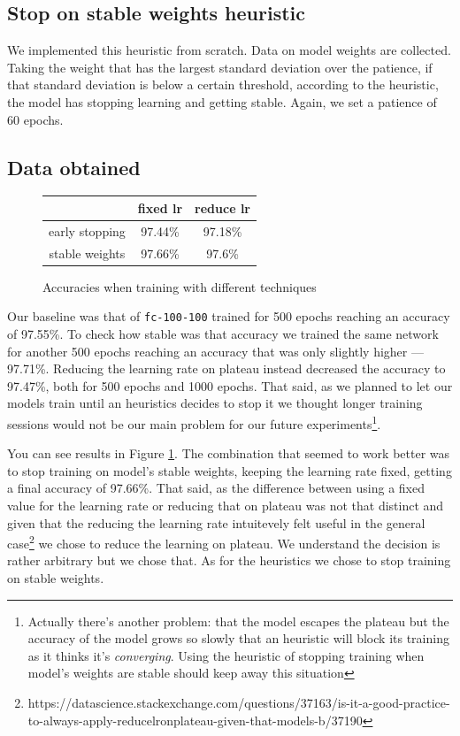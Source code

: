 \subsection{Stop on stable weights heuristic}
We implemented this heuristic from scratch. Data on model weights are
collected. Taking the weight that has the largest standard deviation
over the patience, if that standard deviation is below a certain
threshold, according to the heuristic, the model has stopping learning
and getting stable. Again, we set a patience of 60 epochs.

\subsection{Data obtained}

\begin{figure}
  \centering
  \begin{tabular}{|c|c|c|}
    \hline
    & fixed lr & reduce lr \\
    \hline
    early stopping & 97.44\% & 97.18\% \\
    \hline
    stable weights & 97.66\% & 97.6\% \\
    \hline
  \end{tabular}
  \caption{Accuracies when training with different techniques}
  \label{fig:accuracy-heuristics}
\end{figure}

Our baseline was that of \texttt{fc-100-100} trained for 500 epochs
reaching an accuracy of 97.55\%. To check how stable was that accuracy
we trained the same network for another 500 epochs reaching an accuracy
that was only slightly higher --- 97.71\%. Reducing the learning rate
on plateau instead decreased the accuracy to 97.47\%, both for 500
epochs and 1000 epochs. That said, as we planned to let our models
train until an heuristics decides to stop it we thought longer training
sessions would not be our main problem for our future
experiments\footnote{Actually there's another problem: that the model
  escapes the plateau but the accuracy of the model grows so slowly
  that an heuristic will block its training as it thinks it's
  \emph{converging}. Using the heuristic of stopping training when
  model's weights are stable should keep away this situation}.

You can see results in Figure \ref{fig:accuracy-heuristics}. The
combination that seemed to work better was to stop training on model's
stable weights, keeping the learning rate fixed, getting a final
accuracy of 97.66\%. That said, as the difference between using a fixed
value for the learning rate or reducing that on plateau was not that
distinct and given that the reducing the learning rate intuitevely felt
useful in the general
case\footnote{https://datascience.stackexchange.com/questions/37163/is-it-a-good-practice-to-always-apply-reducelronplateau-given-that-models-b/37190}
we chose to reduce the learning on plateau. We understand the decision
is rather arbitrary but we chose that. As for the heuristics we chose
to stop training on stable weights.

